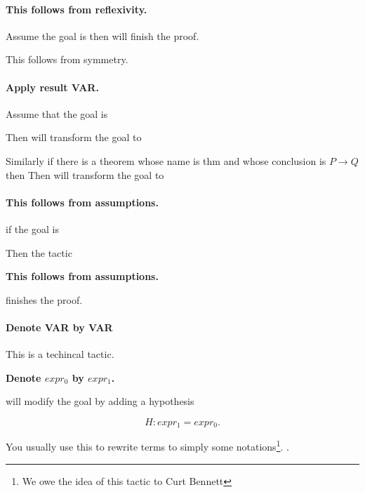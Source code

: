 \paragraph{\bf This follows from reflexivity.}
Assume the goal is 
 then  will finish the proof.
 
This follows from symmetry.


\paragraph{\bf Apply result VAR.}
Assume that the goal is
 
Then  will transform the goal to


Similarly if there is a theorem whose name is thm and whose conclusion is $ P\rightarrow Q $then
Then  will transform the goal to


\paragraph{\bf This follows from assumptions.}
if the goal is 


Then the tactic

{\bf This follows from assumptions.}

finishes the proof.


\paragraph{\bf Denote VAR by VAR}
This is a techincal tactic. 

{\bf Denote $expr_0$ by $expr_1$.}

 will modify the goal by adding a hypothesis 
 
 $$H: expr_1 = expr_0.$$
 
 You usually use this to rewrite terms to simply some notations\footnote{We owe the idea of this tactic to Curt Bennett}.
.